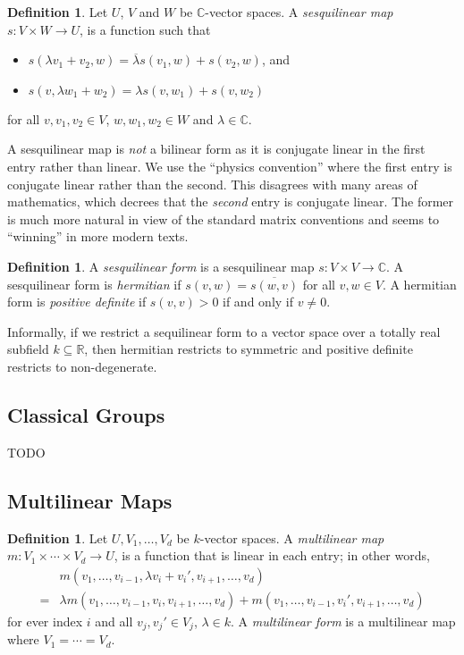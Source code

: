 \documentclass[12pt]{article}
\theoremstyle{plain}
\theoremstyle{definition}
\newtheorem{definition}[theorem]{Definition}
\theoremstyle{remark}
\numberwithin{equation}{section}
\begin{document}
\begin{definition}
Let $U$, $V$ and $W$ be $\mathbb{C}$-vector spaces.
A \emph{sesquilinear map} $s: V \times W \to U$,
is a function such that
\begin{itemize}
\item $s(\lambda v_1+v_2,w) = \overline{\lambda} s(v_1,w) + s(v_2,w)$, and
\item $s(v,\lambda w_1+w_2) = \lambda s(v,w_1) + s(v,w_2)$
\end{itemize}
for all $v,v_1,v_2 \in V$, $w,w_1,w_2 \in W$ and $\lambda \in \mathbb{C}$.
\end{definition}

A sesquilinear map is \emph{not} a bilinear form as it is conjugate
linear in the first entry rather than linear.
We use the ``physics convention'' where the first entry is conjugate
linear rather than the second.  This disagrees with many areas of
mathematics, which decrees that the \emph{second} entry is conjugate linear.
The former is much more natural in view of the standard matrix
conventions and seems to ``winning'' in more modern texts.

\begin{definition}
A \emph{sesquilinear form} is a sesquilinear map $s: V \times V \to
\mathbb{C}$.
A sesquilinear form is \emph{hermitian} if $s(v,w)=\overline{s(w,v)}$
for all $v,w \in V$.
A hermitian form is \emph{positive definite} if $s(v,v) > 0$ if and only
if $v \ne 0$.
\end{definition}

Informally, if we restrict a sequilinear form to a vector space over a totally real
subfield $k \subseteq \mathbb{R}$, then hermitian restricts to symmetric
and positive definite restricts to non-degenerate.

\subsection{Classical Groups}

TODO

\subsection{Multilinear Maps}

\begin{definition}
Let $U,V_1,\ldots, V_d$ be $k$-vector spaces.
A \emph{multilinear map} $m: V_1 \times \cdots \times V_d \to U$,
is a function that is linear in each entry; in other words,
\begin{align*}
&m(v_1,\ldots,v_{i-1},\lambda v_i + v_i',v_{i+1},\ldots,v_d)\\
=& \lambda m(v_1,\ldots,v_{i-1},v_i,v_{i+1},\ldots,v_d)
+ m(v_1,\ldots,v_{i-1},v_i',v_{i+1},\ldots,v_d)
\end{align*}
for ever index $i$ and all $v_j,v_j' \in V_j$, $\lambda \in k$.
A \emph{multilinear form} is a multilinear map where $V_1 = \cdots = V_d$.
\end{definition}
\end{document}
